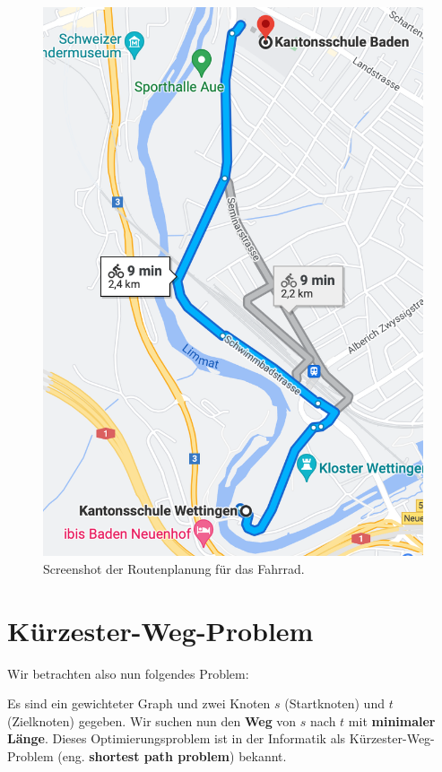 \begin{enumerate}
\begin{figure}[htb]
\centering
\includegraphics[scale=0.46]{google_maps_kswe_ksb_aufgabe}
\caption{Screenshot der Routenplanung für das Fahrrad.}
\label{figure-map-kswe}
\end{figure}


\end{enumerate}

\newpage

\section{Kürzester-Weg-Problem}

Wir betrachten also nun folgendes Problem:

\begin{problem}\label{problem-shortest-path}
	Es sind ein gewichteter Graph und zwei Knoten $s$ (Startknoten) und $t$ (Zielknoten) gegeben. Wir suchen nun den \textbf{Weg} von $s$ nach $t$ mit \textbf{minimaler Länge}. Dieses Optimierungsproblem ist in der Informatik als Kürzester-Weg-Problem (eng. \textbf{shortest path problem}) bekannt.
\end{problem}

